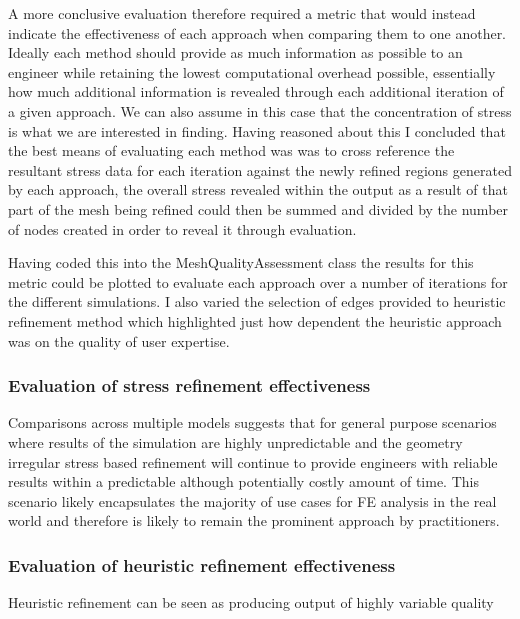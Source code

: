 A more conclusive evaluation therefore required a metric that would instead indicate the effectiveness of each approach when comparing them to one another. Ideally each method should provide as much information as possible to an engineer while retaining the lowest computational overhead possible, essentially how much additional information is revealed through each additional iteration of a given approach. We can also assume in this case that the concentration of stress is what we are interested in finding. Having reasoned about this I concluded that the best means of evaluating each method was was to cross reference the resultant stress data for each iteration against the newly refined regions generated by each approach, the overall stress revealed within the output as a result of that part of the mesh being refined could then be summed and divided by the number of nodes created in order to reveal it through evaluation.



Having coded this into the MeshQualityAssessment class the results for this metric could be plotted to evaluate each approach over a number of iterations for the different simulations. I also varied the selection of edges provided to heuristic refinement method which highlighted just how dependent the heuristic approach was on the quality of user expertise.



\subsubsection{Evaluation of stress refinement effectiveness}
Comparisons across multiple models suggests that for general purpose scenarios where results of the simulation are highly unpredictable and the geometry irregular stress based refinement will continue to provide engineers with reliable results within a predictable although potentially costly amount of time. This scenario likely encapsulates the majority of use cases for FE analysis in the real world and therefore is likely to remain the prominent approach by practitioners.




\subsubsection{Evaluation of heuristic refinement effectiveness}
Heuristic refinement can be seen as producing output of highly variable quality


